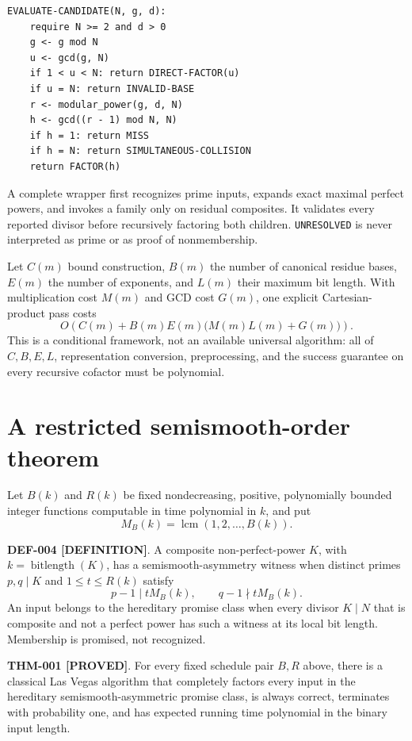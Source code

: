 \documentclass[11pt]{article}
\newcommand{\claimstatus}[2]{\textbf{#1 [#2]}}
\begin{document}
\begin{verbatim}
EVALUATE-CANDIDATE(N, g, d):
    require N >= 2 and d > 0
    g <- g mod N
    u <- gcd(g, N)
    if 1 < u < N: return DIRECT-FACTOR(u)
    if u = N: return INVALID-BASE
    r <- modular_power(g, d, N)
    h <- gcd((r - 1) mod N, N)
    if h = 1: return MISS
    if h = N: return SIMULTANEOUS-COLLISION
    return FACTOR(h)
\end{verbatim}

A complete wrapper first recognizes prime inputs, expands exact maximal
perfect powers, and invokes a family only on residual composites. It validates
every reported divisor before recursively factoring both children.
\texttt{UNRESOLVED} is never interpreted as prime or as proof of
nonmembership.

Let \(C(m)\) bound construction, \(B(m)\) the number of canonical residue
bases, \(E(m)\) the number of exponents, and \(L(m)\) their maximum bit length.
With multiplication cost \(M(m)\) and GCD cost \(G(m)\), one explicit
Cartesian-product pass costs
\[
O\!\left(
C(m)+B(m)E(m)\bigl(M(m)L(m)+G(m)\bigr)
\right).
\]
This is a conditional framework, not an available universal algorithm: all
of \(C,B,E,L\), representation conversion, preprocessing, and the success
guarantee on every recursive cofactor must be polynomial.

\section{A restricted semismooth-order theorem}

Let \(B(k)\) and \(R(k)\) be fixed nondecreasing, positive,
polynomially bounded integer functions computable in time polynomial in
\(k\), and put
\[
M_B(k)=\operatorname{lcm}(1,2,\ldots,B(k)).
\]

\claimstatus{DEF-004}{DEFINITION}. A composite non-perfect-power \(K\), with
\(k=\operatorname{bitlength}(K)\), has a semismooth-asymmetry witness when distinct
primes \(p,q\mid K\) and \(1\le t\le R(k)\) satisfy
\[
p-1\mid tM_B(k),\qquad q-1\nmid tM_B(k).
\]
An input belongs to the hereditary promise class when every divisor \(K\mid N\)
that is composite and not a perfect power has such a witness at its local bit
length. Membership is promised, not recognized.

\claimstatus{THM-001}{PROVED}. For every fixed schedule pair \(B,R\) above,
there is a classical Las Vegas algorithm that completely factors every input
in the hereditary semismooth-asymmetric promise class, is always correct,
terminates with probability one, and has expected running time polynomial in
the binary input length.
\end{document}
